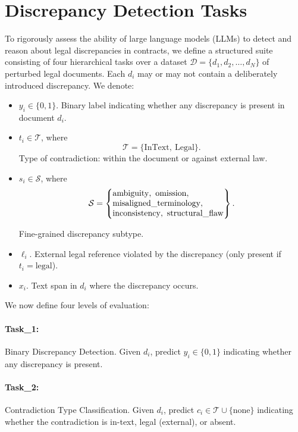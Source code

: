 \documentclass[11pt]{article}
\begin{document}
\section{Discrepancy Detection Tasks}

To rigorously assess the ability of large language models (LLMs) to detect and reason about legal discrepancies in contracts, we define a structured suite consisting of four hierarchical tasks over a dataset $\mathcal{D} = \{d_1, d_2, \dots, d_N\}$ of perturbed legal documents. Each $d_i$ may or may not contain a deliberately introduced discrepancy. We denote:
\begin{itemize}[leftmargin=*,itemsep=0.1em]
\item $y_i \in \{0, 1\}$. Binary label indicating whether any discrepancy is present in document $d_i$.
    
    \item $t_i \in \mathcal{T}$, where
    \[
    \mathcal{T} = \{\mathrm{InText},\ \mathrm{Legal}\}.
    \]
    Type of contradiction: within the document or against external law.
    
    \item $s_i \in \mathcal{S}$, where
    \[
    \mathcal{S}
    = \left\{
    \begin{array}{@{}l@{}}
    \mathrm{ambiguity},\ \mathrm{omission},\\
    \mathrm{misaligned\_terminology},\\
    \mathrm{inconsistency},\ \mathrm{structural\_flaw}
    \end{array}
    \right\}.
    \]


    Fine-grained discrepancy subtype.
    
    \item $\ell_i$. External legal reference violated by the discrepancy (only present if $t_i = \mathrm{legal}$).
    
    \item $x_i$. Text span in $d_i$ where the discrepancy occurs.
\end{itemize}

We now define four levels of evaluation:

\paragraph{Task\_1:}
 Binary Discrepancy Detection. Given $d_i$, predict $y_i \in \{0, 1\}$ indicating whether any discrepancy is present.

\paragraph{Task\_2:}
 Contradiction Type Classification. Given $d_i$, predict $c_i \in \mathcal{T} \cup \{\text{none}\}$ indicating whether the contradiction is in-text, legal (external), or absent.
\end{document}
